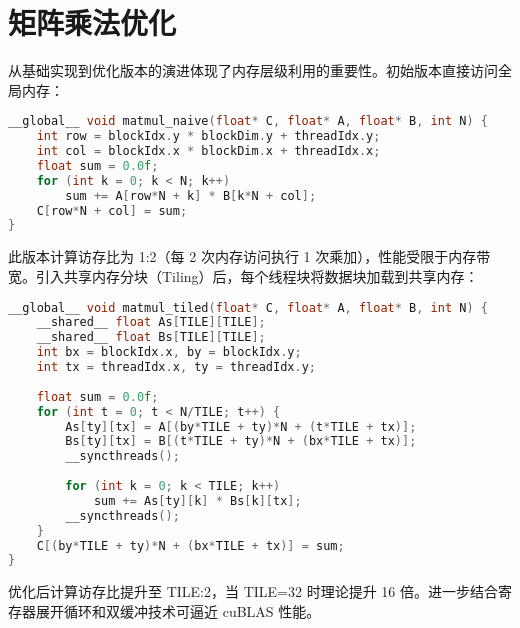 \section{矩阵乘法优化}
从基础实现到优化版本的演进体现了内存层级利用的重要性。初始版本直接访问全局内存：\par
\begin{lstlisting}[language=cpp]
__global__ void matmul_naive(float* C, float* A, float* B, int N) {
    int row = blockIdx.y * blockDim.y + threadIdx.y;
    int col = blockIdx.x * blockDim.x + threadIdx.x;
    float sum = 0.0f;
    for (int k = 0; k < N; k++)
        sum += A[row*N + k] * B[k*N + col];
    C[row*N + col] = sum;
}
\end{lstlisting}
此版本计算访存比为 1:2（每 2 次内存访问执行 1 次乘加），性能受限于内存带宽。引入共享内存分块（Tiling）后，每个线程块将数据块加载到共享内存：\par
\begin{lstlisting}[language=cpp]
__global__ void matmul_tiled(float* C, float* A, float* B, int N) {
    __shared__ float As[TILE][TILE];
    __shared__ float Bs[TILE][TILE];
    int bx = blockIdx.x, by = blockIdx.y;
    int tx = threadIdx.x, ty = threadIdx.y;
    
    float sum = 0.0f;
    for (int t = 0; t < N/TILE; t++) {
        As[ty][tx] = A[(by*TILE + ty)*N + (t*TILE + tx)];
        Bs[ty][tx] = B[(t*TILE + ty)*N + (bx*TILE + tx)];
        __syncthreads();
        
        for (int k = 0; k < TILE; k++)
            sum += As[ty][k] * Bs[k][tx];
        __syncthreads();
    }
    C[(by*TILE + ty)*N + (bx*TILE + tx)] = sum;
}
\end{lstlisting}
优化后计算访存比提升至 TILE:2，当 TILE=32 时理论提升 16 倍。进一步结合寄存器展开循环和双缓冲技术可逼近 cuBLAS 性能。\par
